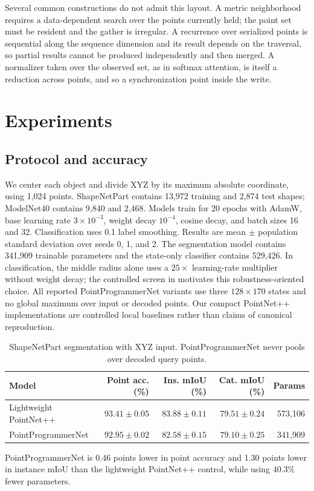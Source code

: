\documentclass[11pt,a4paper]{article}
\begin{document}
Several common constructions do not admit this layout. A metric neighborhood requires a data-dependent search over the points currently held; the point set must be resident and the gather is irregular. A recurrence over serialized points is sequential along the sequence dimension and its result depends on the traversal, so partial results cannot be produced independently and then merged. A normalizer taken over the observed set, as in softmax attention, is itself a reduction across points, and so a synchronization point inside the write.

\section{Experiments}
\subsection{Protocol and accuracy}
We center each object and divide XYZ by its maximum absolute coordinate, using 1,024 points. ShapeNetPart contains 13,972 training and 2,874 test shapes; ModelNet40 contains 9,840 and 2,468. Models train for 20 epochs with AdamW, base learning rate $3\times10^{-3}$, weight decay $10^{-4}$, cosine decay, and batch sizes 16 and 32. Classification uses 0.1 label smoothing. Results are mean $\pm$ population standard deviation over seeds 0, 1, and 2. The segmentation model contains 341,909 trainable parameters and the state-only classifier contains 529,426. In classification, the middle radius alone uses a $25\times$ learning-rate multiplier without weight decay; the controlled screen in  motivates this robustness-oriented choice. All reported PointProgrammerNet variants use three $128\times170$ states and no global maximum over input or decoded points. Our compact PointNet++ implementations are controlled local baselines rather than claims of canonical reproduction.

\begin{table}[t]
\centering
\caption{ShapeNetPart segmentation with XYZ input. PointProgrammerNet never pools over decoded query points.}
\label{tab:segmentation_accuracy}
\begin{tabular}{lrrrr}
\toprule
Model & Point acc. (\%) & Ins. mIoU (\%) & Cat. mIoU (\%) & Params \\
\midrule
Lightweight PointNet++ & $93.41\pm0.05$ & $83.88\pm0.11$ & $79.51\pm0.24$ & 573,106 \\
PointProgrammerNet & $92.95\pm0.02$ & $82.58\pm0.15$ & $79.10\pm0.25$ & 341,909 \\
\bottomrule
\end{tabular}
\end{table}
PointProgrammerNet is 0.46 points lower in point accuracy and 1.30 points lower in instance mIoU than the lightweight PointNet++ control, while using 40.3\% fewer parameters.
\end{document}
